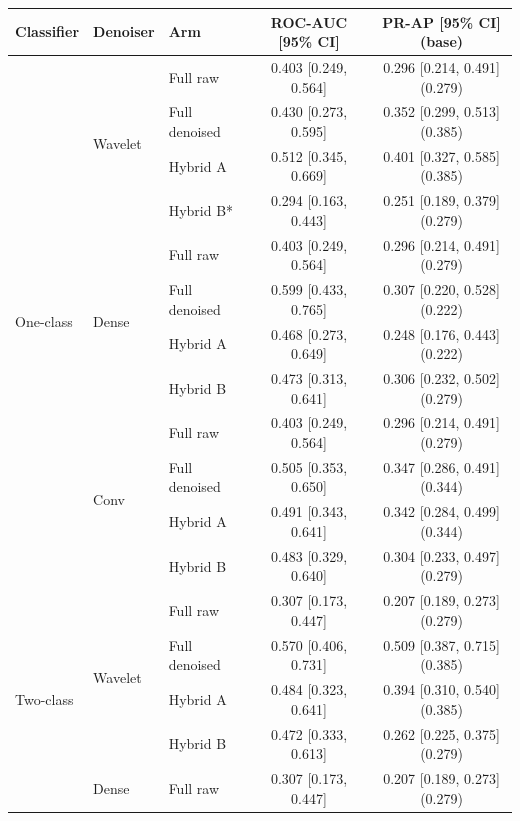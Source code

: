 \documentclass[ %
                    author={Daniel Page},
                supervisor={Dr. Andrew Calway},
                    degree={MSc},
                     title={Some Structural Guidelines for Data Science MSc Theses, Including Those With Long Titles that Run Across Multiple Lines on the Front Page},
                  subtitle={And those including an optional subtitle too, for good measure},
                      type={},
                      year={2021}]{dissertation}
\begin{document}
\begin{table}[H]
    \centering
    \small
    \begin{tabular}{lllcc}
    \toprule
    Classifier & Denoiser & Arm & ROC-AUC [95\% CI] & PR-AP [95\% CI] (base) \\
    \midrule
    \multirow{12}{*}{One-class}
     & \multirow{4}{*}{Wavelet}
       & Full raw      & 0.403 [0.249, 0.564] & 0.296 [0.214, 0.491] (0.279) \\
     & & Full denoised & 0.430 [0.273, 0.595] & 0.352 [0.299, 0.513] (0.385) \\
     & & Hybrid A      & 0.512 [0.345, 0.669] & 0.401 [0.327, 0.585] (0.385) \\
     & & Hybrid B*     & 0.294 [0.163, 0.443] & 0.251 [0.189, 0.379] (0.279) \\
    \cmidrule{2-5}
     & \multirow{4}{*}{Dense}
       & Full raw      & 0.403 [0.249, 0.564] & 0.296 [0.214, 0.491] (0.279) \\
     & & Full denoised & 0.599 [0.433, 0.765] & 0.307 [0.220, 0.528] (0.222) \\
     & & Hybrid A      & 0.468 [0.273, 0.649] & 0.248 [0.176, 0.443] (0.222) \\
     & & Hybrid B      & 0.473 [0.313, 0.641] & 0.306 [0.232, 0.502] (0.279) \\
    \cmidrule{2-5}
     & \multirow{4}{*}{Conv}
       & Full raw      & 0.403 [0.249, 0.564] & 0.296 [0.214, 0.491] (0.279) \\
     & & Full denoised & 0.505 [0.353, 0.650] & 0.347 [0.286, 0.491] (0.344) \\
     & & Hybrid A      & 0.491 [0.343, 0.641] & 0.342 [0.284, 0.499] (0.344) \\
     & & Hybrid B      & 0.483 [0.329, 0.640] & 0.304 [0.233, 0.497] (0.279) \\
    \midrule
    \multirow{12}{*}{Two-class}
     & \multirow{4}{*}{Wavelet}
       & Full raw      & 0.307 [0.173, 0.447] & 0.207 [0.189, 0.273] (0.279) \\
     & & Full denoised & 0.570 [0.406, 0.731] & 0.509 [0.387, 0.715] (0.385) \\
     & & Hybrid A      & 0.484 [0.323, 0.641] & 0.394 [0.310, 0.540] (0.385) \\
     & & Hybrid B      & 0.472 [0.333, 0.613] & 0.262 [0.225, 0.375] (0.279) \\
    \cmidrule{2-5}
     & \multirow{4}{*}{Dense}
       & Full raw      & 0.307 [0.173, 0.447] & 0.207 [0.189, 0.273] (0.279) \\

\end{tabular}
\end{table}
\end{document}

